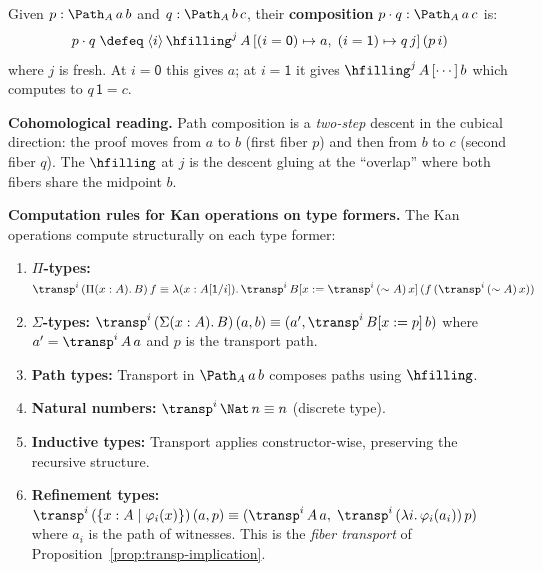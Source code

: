\begin{definition}
\label{def:path-comp}
Given $p : \Path_A\, a\, b$ and $q : \Path_A\, b\, c$, their
\textbf{composition} $p \cdot q : \Path_A\, a\, c$ is:
\[
  p \cdot q \;\defeq\; \langle i \rangle\,
    \hfilling^j\, A\,
    [(i = \mathsf{0}) \mapsto a,\;
     (i = \mathsf{1}) \mapsto q\,j]\,
    (p\,i)
\]
where $j$ is fresh.  At $i = \mathsf{0}$ this gives $a$; at
$i = \mathsf{1}$ it gives $\hfilling^j\, A\, [\cdots]\, b$ which
computes to $q\,\mathsf{1} = c$.

\medskip\noindent\textbf{Cohomological reading.}  Path composition is a
\emph{two-step} descent in the cubical direction: the proof moves from $a$
to $b$ (first fiber $p$) and then from $b$ to $c$ (second fiber $q$).
The $\hfilling$ at $j$ is the descent gluing at the ``overlap'' where
both fibers share the midpoint $b$.
\end{definition}

\noindent
\textbf{Computation rules for Kan operations on type formers.}
The Kan operations compute structurally on each type former:

\begin{enumerate}
\item \textbf{$\Pi$-types:}
  $\transp^i\, (\Pi(x:A).\,B)\, f \equiv
   \lambda(x : A[\mathsf{1}/i]).\,
   \transp^i\, B[x := \transp^i\, (\sim A)\, x]\,
   (f\, (\transp^i\, (\sim A)\, x))$

\item \textbf{$\Sigma$-types:}
  $\transp^i\, (\Sigma(x:A).\,B)\, (a, b) \equiv
   (a', \transp^i\, B[x := p]\, b)$
  where $a' = \transp^i\, A\, a$ and $p$ is the transport path.

\item \textbf{Path types:}
  Transport in $\Path_A\, a\, b$ composes paths using $\hfilling$.

\item \textbf{Natural numbers:} $\transp^i\, \Nat\, n \equiv n$
  (discrete type).

\item \textbf{Inductive types:} Transport applies constructor-wise,
  preserving the recursive structure.

\item \textbf{Refinement types:}
  $\transp^i\, (\{x : A \mid \varphi_i(x)\})\, (a, p) \equiv
   (\transp^i\, A\, a,\; \transp^i\, (\lambda i.\, \varphi_i(a_i))\, p)$
  where $a_i$ is the path of witnesses.
  This is the \emph{fiber transport} of Proposition~\ref{prop:transp-implication}.
\end{enumerate}


